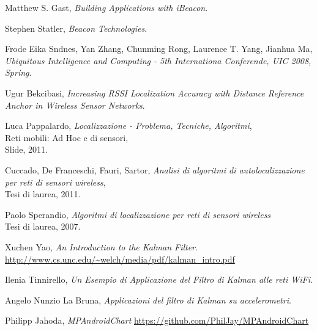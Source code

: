 \begin{thebibliography}{9}
	\bibitem{}
	Matthew S. Gast,
	\textit{Building Applications with iBeacon}.
	
	\bibitem{}
	Stephen Statler,
	\textit{Beacon Technologies}.
	
	\bibitem{}
	Frode Eika Sndnes, Yan Zhang, Chunming Rong, Laurence T. Yang, Jianhua Ma,
	\textit{Ubiquitous Intelligence and Computing - 5th Internationa Conferende, UIC 2008, Spring}.
	
	\bibitem{}
	Ugur Bekcibasi,
	\textit{Increasing RSSI Localization Accuracy with Distance Reference Anchor in Wireless Sensor Networks}.

	
	\bibitem{}
	Luca Pappalardo, 
	\textit{Localizzazione - Problema, Tecniche, Algoritmi},
	\\Reti mobili: Ad Hoc e di sensori, 
	\\Slide, 2011.
	
	\bibitem{}
	Cuccado, De Franceschi, Fauri, Sartor,
	\textit{Analisi di algoritmi di autolocalizzazione per reti di sensori wireless},
	\\Tesi di laurea, 2011.
	
	\bibitem{}
	Paolo Sperandio,
	\textit{Algoritmi di localizzazione per reti di sensori wireless}
	\\Tesi di laurea, 2007.
	
	\bibitem{}
	Xuchen Yao,
	\textit{An Introduction to the Kalman Filter}.
	\\\url{http://www.cs.unc.edu/~welch/media/pdf/kalman_intro.pdf}
		
	\bibitem{}
	Ilenia Tinnirello,
	\textit{Un Esempio di Applicazione 	del Filtro di Kalman alle reti WiFi}.
	
	\bibitem{}
	Angelo Nunzio La Bruna,
	\textit{Applicazioni del filtro di Kalman su accelerometri}.
	
	\bibitem{}
	Philipp Jahoda,
	\textit{MPAndroidChart}
	\url{https://github.com/PhilJay/MPAndroidChart}
\end{thebibliography}
